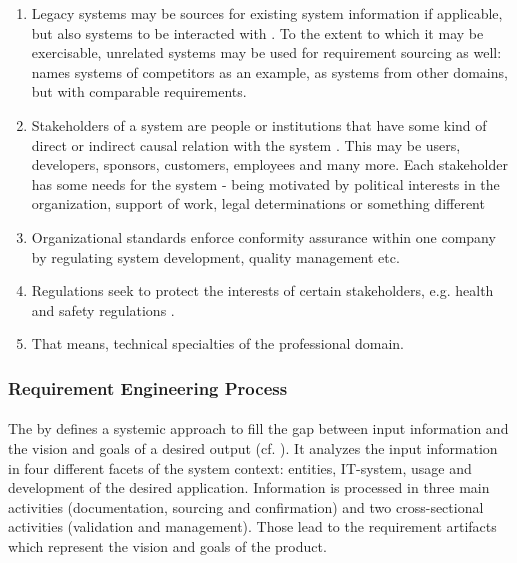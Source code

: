 \begin{enumerate}
    \item Legacy systems may be sources for existing system information if applicable, but also systems to be interacted with \parencite[cf.][28]{Kotonya.2000}. To the extent to which it may be exercisable, unrelated systems may be used for requirement sourcing as well: \textcite[66]{Pohl.2007} names systems of competitors as an example, as systems from other domains, but with comparable requirements.
    \item Stakeholders of a system are people or institutions that have some kind of direct or indirect causal relation with the system \parencite[cf.][8]{Sommerville.2000}. This may be users, developers, sponsors, customers, employees and many more. Each stakeholder has some needs for the system - being motivated by political interests in the organization, support of work, legal determinations or something different \parencites[cf.][28]{Kotonya.2000}[cf.][350-351]{Lauesen.2008}
    \item Organizational standards enforce conformity assurance within one company by regulating system development, quality management etc. \parencite[28]{Kotonya.2000}
    \item Regulations seek to protect the interests of certain stakeholders, e.g. health and safety regulations \parencite[cf.][28]{Kotonya.2000}.
    \item {} \parencite[28]{Kotonya.2000} That means, technical specialties of the professional domain.
\end{enumerate}

\subsubsection{Requirement Engineering Process} 

\paragraph{} The by \textcite{Pohl.2007} defines a systemic approach to fill the gap between input information and the vision and goals of a desired output (cf. ). It analyzes the input information in four different facets of the system context: entities, IT-system, usage and development of the desired application. Information is processed in three main activities\label{mainactivity} (documentation, sourcing and confirmation) and two cross-sectional activities (validation and management). Those lead to the requirement artifacts which represent the vision and goals of the product. \parencite[cf.][38-39]{Pohl.2007}

